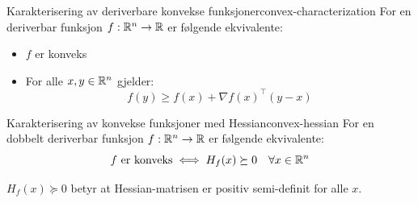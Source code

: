 \begin{theorem}{Karakterisering av deriverbare konvekse funksjoner}{convex-characterization}
  For en deriverbar funksjon  \(f: \mathbb{R}^n \to \mathbb{R}\) er følgende ekvivalente:
  \begin{itemize}
    \item  \(f\) er konveks
    \item For alle  \(x, y \in \mathbb{R}^n\) gjelder:
          \[
            f(y) \geq f(x) + \nabla f(x)^\top (y - x)
          \]
  \end{itemize}
\end{theorem}

\begin{theorem}{Karakterisering av konvekse funksjoner med Hessian}{convex-hessian}
  For en dobbelt deriverbar funksjon  \(f: \mathbb{R}^n \to \mathbb{R}\) er følgende ekvivalente:
  \[
    f \text{ er konveks} \iff H_f(x) \succeq 0 \quad \forall x \in \mathbb{R}^n
  \]

  \(H_f(x) \succeq 0\) betyr at Hessian-matrisen er positiv semi-definit for alle  \(x\).

\end{theorem}

